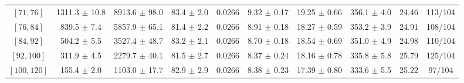 \begin{tabular}{c||c|c|c|c|c|c|c||c|c}
$[71, 76]$ & 1311.3 $\pm$ 10.8 & 8913.6 $\pm$ 98.0 & 83.4 $\pm$ 2.0 & 0.0266 & 9.32 $\pm$ 0.17 & 19.25 $\pm$ 0.66 & 356.1 $\pm$ 4.0 & 24.46 & 113/104\\
$[76, 84]$ & 839.5 $\pm$ 7.4 & 5857.9 $\pm$ 65.1 & 81.4 $\pm$ 2.2 & 0.0266 & 8.91 $\pm$ 0.18 & 18.27 $\pm$ 0.59 & 353.2 $\pm$ 3.9 & 24.91 & 108/104\\
$[84, 92]$ & 504.2 $\pm$ 5.5 & 3527.4 $\pm$ 48.7 & 83.2 $\pm$ 2.1 & 0.0266 & 8.70 $\pm$ 0.18 & 18.54 $\pm$ 0.69 & 351.0 $\pm$ 4.9 & 24.98 & 110/104\\
$[92, 100]$ & 311.9 $\pm$ 4.5 & 2279.7 $\pm$ 40.1 & 81.5 $\pm$ 2.7 & 0.0266 & 8.37 $\pm$ 0.24 & 18.16 $\pm$ 0.78 & 335.8 $\pm$ 5.8 & 25.79 & 125/104\\
$[100, 120]$ & 155.4 $\pm$ 2.0 & 1103.0 $\pm$ 17.7 & 82.9 $\pm$ 2.9 & 0.0266 & 8.38 $\pm$ 0.23 & 17.39 $\pm$ 0.80 & 333.6 $\pm$ 5.5 & 25.22 & 97/104\\
\end{tabular}
